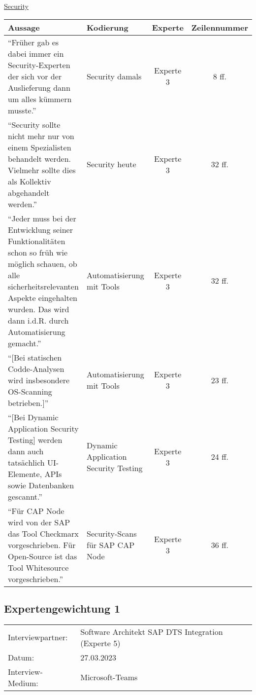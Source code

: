     \underline{Security}\\
    \begin{longtable}{ |C{6cm}|C{3cm}|c|c| }
        \hline
        Aussage & Kodierung & Experte & Zeilennummer\\
        \hline
        \enquote{Früher gab es dabei immer ein Security-Experten der sich vor der Auslieferung dann um alles kümmern musste.} & Security damals & Experte 3 & 8 ff. \\
        \hline
        \enquote{Security sollte nicht mehr nur von einem Spezialisten behandelt werden. Vielmehr sollte dies als Kollektiv abgehandelt werden.} & Security heute  & Experte 3 & 32 ff. \\
        \hline

        \enquote{Jeder muss bei der Entwicklung seiner Funktionalitäten schon so früh wie möglich schauen, ob alle sicherheitsrelevanten Aspekte eingehalten wurden. Das wird dann i.d.R. durch Automatisierung gemacht.} & Automatisierung mit Tools  & Experte 3 & 32 ff. \\
        \hline
        \enquote{[Bei statischen Codde-Analysen wird insbesondere OS-Scanning betrieben.]} & Automatisierung mit Tools  & Experte 3 & 23 ff. \\
        \hline
        \enquote{[Bei Dynamic Application Security Testing] werden dann auch tatsächlich UI-Elemente, APIs sowie Datenbanken gescannt.} & Dynamic Application Security Testing & Experte 3 & 24 ff. \\
        \hline
        \enquote{Für CAP Node wird von der SAP das Tool Checkmarx vorgeschrieben. Für Open-Source ist das Tool Whitesource vorgeschrieben.} & Security-Scans für SAP CAP Node  & Experte 3 & 36 ff. \\
        \hline
        \end{longtable}


        \newpage
        \subsection{Expertengewichtung 1}
        \label{sec:Expertengewichtung}
                \begin{tabular}{ l l }
            Interviewpartner: & Software Architekt SAP DTS Integration (Experte 5)\\
            Datum: & 27.03.2023\\
            Interview-Medium: & Microsoft-Teams\\
    \end{tabular}
    \begin{center}
        \begin{figure}[H]
            \centering
            \label{fig:CEA}
        \end{figure}	
    \end{center}
    \begin{center}
        \begin{figure}[H]
            \centering
            \label{fig:CEA}
        \end{figure}	
    \end{center}

